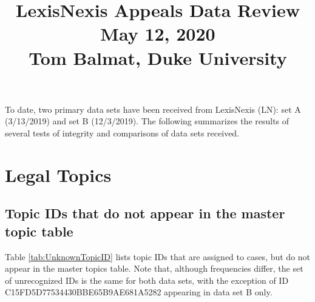 \documentclass[10pt, letterpaper]{article}
\title{\vspace{-0.5in}\large LexisNexis Appeals Data Review\\[4pt]
       \normalsize May 12, 2020\\[4pt]Tom Balmat, Duke University\\[-20pt]}
\date{}
\begin{document}
    
\begin{spacing}{1.0}

\maketitle

To date, two primary data sets have been received from LexisNexis (LN):  set A (3/13/2019) and set B (12/3/2019).  The following summarizes the results of several tests of integrity and comparisons of data sets received.

\vspace{0.5in}

\renewcommand\cfttoctitlefont{\large}
\renewcommand\cftsecfont{\normalsize}
\renewcommand\cftsecpagefont{\normalsize}
\renewcommand\cftsubsecfont{\normalsize}
\renewcommand\cftsubsecpagefont{\normalsize}
\renewcommand{\cftsecleader}{\cftdotfill{\cftdotsep}}
\renewcommand*\contentsname{List of Sections}
    \begin{minipage}{5.5in}
        \tableofcontents
    \end{minipage}

\clearpage


\section{Legal Topics}


\subsection{Topic IDs that do not appear in the master topic table}

Table \ref{tab:UnknownTopicID} lists topic IDs that are assigned to cases, but do not appear in the master topics table.  Note that, although frequencies differ, the set of unrecognized IDs is the same for both data sets, with the exception of ID C15FD5D77534430BBE65B9AE681A5282 appearing in data set B only.

\vspace{0.25in}


\end{spacing}
\end{document}
